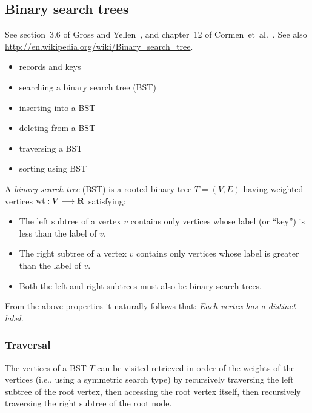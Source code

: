 
\subsection{Binary search trees}

See section~3.6 of Gross and Yellen~\cite{GrossYellen1999}, and
chapter~12 of Cormen~et~al.~\cite{CormenEtAl2001}. See also
\url{http://en.wikipedia.org/wiki/Binary_search_tree}.


\begin{itemize}
\item records and keys

\item searching a binary search tree (BST)

\item inserting into a BST

\item deleting from a BST

\item traversing a BST

\item sorting using BST
\end{itemize}

A {\it binary search tree} (BST) is a rooted binary tree
$T=(V,E)$ having weighted vertices ${\rm wt}:V\longrightarrow \mathbf{R}$ satisfying:

\begin{itemize}
\item
 The left subtree of a vertex $v$ contains only vertices whose label
(or ``key'') is less than the label of $v$.
\item
The right subtree of a vertex $v$ contains only vertices whose label
  is greater than the label of $v$.
\item
Both the left and right subtrees must also be binary search trees.
\end{itemize}

From the above properties it naturally follows that:
{\it Each vertex has a distinct label.}


\subsubsection{Traversal}

The vertices of a BST $T$ can be visited retrieved in-order of the
weights of the vertices (i.e.,
using a symmetric search type) by recursively  traversing the left subtree of the
root vertex, then accessing the root vertex itself, then recursively traversing the
right subtree of the root node.

